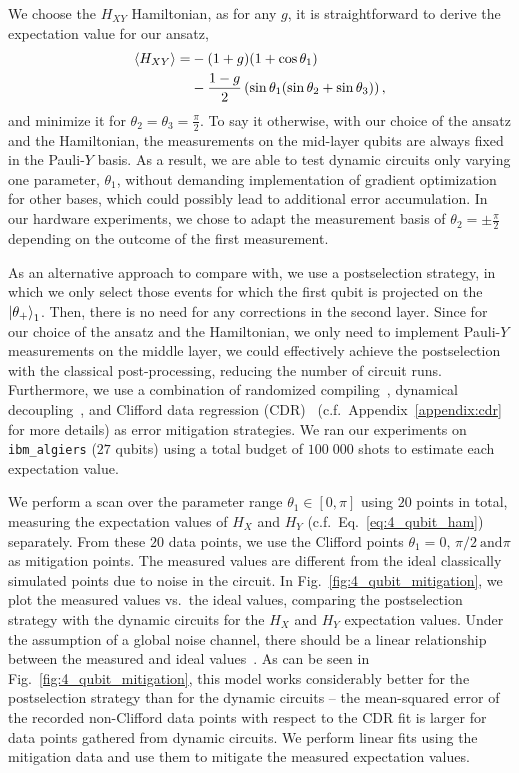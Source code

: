 \documentclass[../main.tex]{subfiles}
\begin{document}
We choose the $H_{XY}$ Hamiltonian, as for any $g$, it is straightforward to derive the expectation value for our ansatz,
\begin{align}\label{eq:variation_exp}
    \expval{H_{XY}} = &-(1+g)(1+\cos \theta_1)\\
    &-\frac{1-g}{2}\left(\sin\theta_1(\sin\theta_2 +\sin \theta_3)\right),
\end{align}
and minimize it for $\theta_2=\theta_3=\frac{\pi}{2}$. To say it otherwise, with our choice of the ansatz and the Hamiltonian, the measurements on the mid-layer qubits are always fixed in the Pauli-$Y$ basis. As a result, we are able to test dynamic circuits only varying one parameter, $\theta_1$, without demanding implementation of gradient optimization for other bases, which could possibly lead to additional error accumulation. In our hardware experiments, we chose to adapt the measurement basis of $\theta_2=\pm\frac{\pi}{2}$ depending on the outcome of the first measurement. 



As an alternative approach to compare with, we use a postselection strategy, in which we only select those events for which the first qubit is projected on the $\ket{\theta_+}_1$. Then,
there is no need for any corrections in the second layer. Since for our choice of the ansatz and the Hamiltonian, we only need to implement Pauli-$Y$ measurements on the middle layer, we could effectively achieve the postselection with the classical post-processing, reducing the number of circuit runs. Furthermore, we use a combination of randomized compiling~\cite{wallman2015noise}, dynamical decoupling~\cite{PhysRevA.58.2733}, and  Clifford data regression (CDR)~\cite{Czarnik2021errormitigation} (c.f.~Appendix~\ref{appendix:cdr} for more details) as error mitigation strategies.
We ran our experiments on \texttt{ibm\_algiers} ($27$ qubits) using a total budget of $100\; 000$ shots to estimate each expectation value.


We perform a scan over the parameter range $\theta_1 \in [0,\pi]$ using $20$ points in total, measuring the expectation values of $H_X$ and $H_Y$ (c.f.~Eq.~\eqref{eq:4_qubit_ham}) separately.
From these $20$ data points, we use the Clifford points $\theta_1=0,\,\pi/2\ \mathrm{and} \pi$ as mitigation points.
The measured values are different from the ideal classically simulated points due to noise in the circuit.
In Fig.~\ref{fig:4_qubit_mitigation}, we plot the measured values vs.~the ideal values, comparing the postselection strategy with the dynamic circuits for the $H_X$ and $H_Y$ expectation values.
Under the assumption of a global noise channel, there should be a linear relationship between the measured and ideal values~\cite{Czarnik2021errormitigation}.
As can be seen in Fig.~\ref{fig:4_qubit_mitigation}, this model works considerably better for the postselection strategy than for the dynamic circuits -- the mean-squared error of the recorded non-Clifford data points with respect to the CDR fit is larger for data points gathered from dynamic circuits.
We perform linear fits using the mitigation data and use them to mitigate the measured expectation values.
\end{document}
